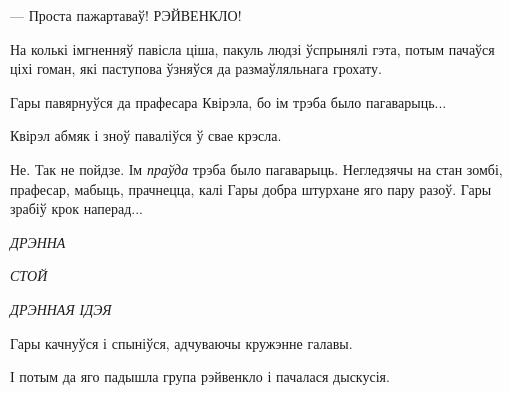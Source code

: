 --- Проста пажартаваў! РЭЙВЕНКЛО!

На колькі імгненняў павісла ціша, пакуль людзі ўспрынялі гэта, потым пачаўся ціхі гоман,
які паступова ўзняўся да размаўляльнага грохату.

Гары павярнуўся да прафесара Квірэла, бо ім трэба было пагаварыць...

Квірэл абмяк і зноў паваліўся ў свае крэсла.

Не. Так не пойдзе. Ім  \emph{праўда} трэба было пагаварыць. Негледзячы на 
стан зомбі, прафесар, мабыць, прачнецца, калі Гары добра штурхане яго пару разоў.
Гары зрабіў крок наперад...

\emph{ДРЭННА}

\emph{СТОЙ}

\emph{ДРЭННАЯ ІДЭЯ}

Гары качнуўся і спыніўся, адчуваючы кружэнне галавы.

І потым да яго падышла група рэйвенкло і пачалася дыскусія.

